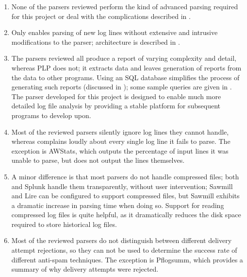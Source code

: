 \begin{enumerate}

    \item None of the parsers reviewed perform the kind of advanced parsing
        required for this project or deal with the complications described
        in .

    \item Only \parsername{} enables parsing of new log lines without
        extensive and intrusive modifications to the parser; \parsernames{}
        architecture is described in .

    \item The parsers reviewed all produce a report of varying complexity
        and detail, whereas \gls{PLP} does not; it extracts data and leaves
        generation of reports from the data to other programs.  Using an
        \gls{SQL} database simplifies the process of generating such
        reports (discussed in ); some sample
        queries are given in .  The parser developed
        for this project is designed to enable much more detailed log file
        analysis by providing a stable platform for subsequent programs to
        develop upon.

    \item Most of the reviewed parsers silently ignore log lines they
        cannot handle, whereas \parsername{} complains loudly about every
        single log line it fails to parse.  The exception is AWStats, which
        outputs the percentage of input lines it was unable to parse, but
        does not output the lines themselves.

    \item A minor difference is that most parsers do not handle compressed
        files; both \parsername{} and Splunk handle them transparently,
        without user intervention; Sawmill and Lire can be configured to
        support compressed files, but Sawmill exhibits a dramatic increase
        in parsing time when doing so.  Support for reading compressed log
        files is quite helpful, as it dramatically reduces the disk space
        required to store historical log files.

    \item Most of the reviewed parsers do not distinguish between different
        delivery attempt rejections, so they can not be used to determine
        the success rate of different anti-spam techniques.  The exception
        is Pflogsumm, which provides a summary of why delivery attempts
        were rejected.

\end{enumerate}

